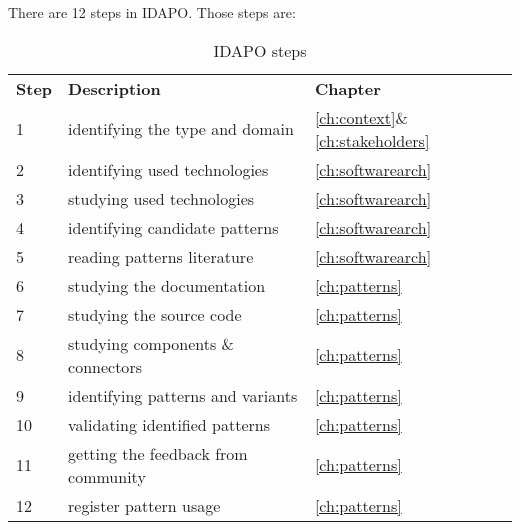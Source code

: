 There are 12 steps in IDAPO. Those steps are:\\
\begin{table}[H]
\begin{tabular}{l l l}
\textbf{Step} & \textbf{Description} & \textbf{Chapter} \\
1 & identifying the type and domain & \ref{ch:context}\&\ref{ch:stakeholders} \\
2 & identifying used technologies & \ref{ch:softwarearch} \\
3 & studying used technologies & \ref{ch:softwarearch} \\
4 & identifying candidate patterns & \ref{ch:softwarearch} \\
5 	& 	reading patterns literature 	& 	\ref{ch:softwarearch} 	\\
6 	& 	studying the documentation 		& 	\ref{ch:patterns} 		\\
7 	& 	studying the source code 		&	\ref{ch:patterns} \\
8 & studying components \& connectors 	&	\ref{ch:patterns} \\
9 & identifying patterns and variants 	&	\ref{ch:patterns} \\
10 & validating identified patterns 	& 	\ref{ch:patterns} \\
11 & getting the feedback from community 	&	\ref{ch:patterns} \\
12 & register pattern usage 				&	\ref{ch:patterns} \\
\end{tabular}
\caption{IDAPO steps}
\label{table:idaposteps}
\end{table}


